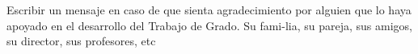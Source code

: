 \fontsize{11pt}{11pt}\selectfont %
\vspace*{0.2cm}
Escribir un mensaje en caso de que sienta agradecimiento por alguien que lo haya apoyado en el desarrollo del Trabajo de Grado. Su fami-lia, su pareja, sus amigos, su director, sus profesores, etc\\
